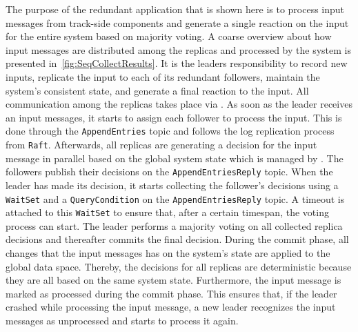 The purpose of the redundant application that is shown here is to process input messages from track-side components and generate a single reaction on the input for the entire system based on majority voting.
A coarse overview about how input messages are distributed among the replicas and processed by the system is presented in~\autoref{fig:SeqCollectResults}.
It is the leaders responsibility to record new inputs, replicate the input to each of its redundant followers, maintain the system's consistent state, and generate a final reaction to the input.
All communication among the replicas takes place via .
As soon as the leader receives an input messages, it starts to assign each follower to process the input.
This is done through the \texttt{AppendEntries} topic and follows the log replication process from \texttt{Raft}.
Afterwards, all replicas are generating a decision for the input message in parallel based on the global system state which is managed by .
The followers publish their decisions on the \texttt{AppendEntriesReply} topic.
When the leader has made its decision, it starts collecting the follower's decisions using a \texttt{WaitSet} and a \texttt{QueryCondition} on the \texttt{AppendEntriesReply} topic.
A timeout is attached to this \texttt{WaitSet} to ensure that, after a certain timespan, the voting process can start.
The leader performs a majority voting on all collected replica decisions and thereafter commits the final decision.
During the commit phase, all changes that the input messages has on the system's state are applied to the global data space.
Thereby, the decisions for all replicas are deterministic because they are all based on the same system state.
Furthermore, the input message is marked as processed during the commit phase.
This ensures that, if the leader crashed while processing the input message, a new leader recognizes the input messages as unprocessed and starts to process it again.

